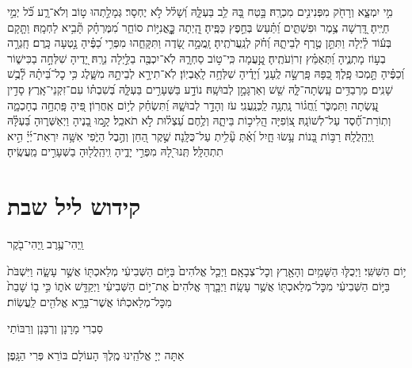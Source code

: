 \documentclass[twoside, openany, parskip=half, 11pt]{book}
\begin{document}
מִ֣י יִמְצָ֑א וְרָחֹ֖ק מִפְּנִינִ֣ים מִכְרָֽהּ׃ \hfill \break
בָּ֣טַח בָּ֭הּ לֵ֥ב בַּעְלָּ֑הּ וְ֝שָׁל֗ל לֹ֣א יֶחְסָר׃ \hfill \break
גְּמָלַ֣תְהוּ ט֣וֹב וְלֹא־רָ֑ע כֹּ֝֗ל יְמֵ֣י חַיֶּֽיהָ׃ \hfill \break
דָּֽ֭רְשָׁה צֶ֥מֶר וּפִשְׁתִּ֑ים וַ֝תַּ֗עַשׂ בְּחֵ֣פֶץ כַּפֶּֽיהָ׃ \hfill \break
הָֽ֭יְתָה כׇׇׇׇׇׇׇׇּֽאֳנִיּ֣וֹת סוֹחֵ֑ר מִ֝מֶּרְחָ֗ק תָּ֘בִ֥יא לַחְמָֽהּ׃ \hfill \break
וַתָּ֤קָם בְּע֬וֹד לַ֗יְלָה וַתִּתֵּ֣ן טֶ֣רֶף לְבֵיתָ֑הּ וְ֝חֹ֗ק לְנַֽעֲרֹתֶֽיהָ׃ \hfill \break
זָֽמֲמָ֣ה שָׂ֭דֶה וַתִּקָּחֵ֑הוּ מִפְּרִ֥י כַ֝פֶּ֗יהָ נָ֣טְעָה כָּֽרֶם׃ \hfill \break
חָֽגְרָ֣ה בְע֣וֹז מָתְנֶ֑יהָ וַ֝תְּאַמֵּ֗ץ זְרוֹֽעֹתֶֽיהָ׃ \hfill \break
טָֽ֣֭עֲמָה כִּֽי־ט֣וֹב סַחְרָ֑הּ לֹֽא־יִכְבֶּ֖ה בַלַּ֣יְלָה נֵרָֽהּ׃ \hfill \break
יָ֭דֶיהָ שִׁלְּחָ֣ה בַכִּישׁ֑וֹר וְ֝כַפֶּ֗יהָ תָּ֣מְכוּ פָֽלֶךְ׃ \hfill \break
כַּ֭פָּהּ פָּֽרְשָׂ֣ה לֶֽעָנִ֑י וְ֝יָדֶ֗יהָ שִׁלְּחָ֥ה לָֽאֶבְיֽוֹן׃ \hfill \break
לֹֽא־תִירָ֣א לְבֵיתָ֣הּ מִשָּׁ֑לֶג כִּ֥י כׇל־בֵּ֝יתָ֗הּ לָ֘בֻ֥שׁ שָׁנִֽים׃ \hfill \break
מַרְבַדִּ֥ים עָֽשְׂתָה־לָּ֑הּ שֵׁ֖שׁ וְאַרְגָּמָ֣ן לְבוּשָֽׁהּ׃ \hfill \break
נוֹדָ֣ע בַּשְּׁעָרִ֣ים בַּעְלָּ֑הּ בְּ֝שִׁבְתּ֗וֹ עִם־זִקְנֵי־אָֽרֶץ׃ \hfill \break
סָדִ֣ין עָֽ֭שְׂתָה וַתִּמְכֹּ֑ר וַֽ֝חֲג֗וֹר נָֽתְנָ֥ה לַֽכְּנַֽעֲנִֽי׃ \hfill \break
עֹז וְהָדָ֣ר לְבוּשָׁ֑הּ וַ֝תִּשְׂחַ֗ק לְי֣וֹם אַֽחֲרֽוֹן׃ \hfill \break
פִּ֭יהָ פָּֽתְחָ֣ה בְחָכְמָ֑ה וְתֽוֹרַת־חֶ֝֗סֶד עַל־לְשׁוֹנָֽהּ׃ \hfill \break
צ֭וֹֽפִיָּה הֲֽלִיכ֣וֹת בֵּיתָ֑הּ וְלֶ֥חֶם עַ֝צְל֗וּת לֹ֣א תֹאכֵֽל׃ \hfill \break
קָ֣מוּ בָ֭נֶיהָ וַיְאַשְּׁר֑וּהָ בַּ֝עְלָּ֗הּ וַֽיְהַֽלֲלָֽהּ׃ \hfill \break
רַבּ֣וֹת בָּ֭נוֹת עָ֥שׂוּ חָ֑יִל וְ֝אַ֗תְּ עָ֘לִ֥יתְ עַל־כֻּלָּֽנָה׃ \hfill \break
שֶׁ֣קֶר הַ֭חֵן וְהֶ֣בֶל הַיֹּ֑פִי אִשָּׁ֥ה יִרְאַת־יְ֜יָ֗ הִ֣יא תִתְהַלָּֽל׃\hfill \break
תְּֽנוּ־לָ֭הּ מִפְּרִ֣י יָדֶ֑יהָ וִֽיהַֽלֲל֖וּהָ בַשְּׁעָרִ֣ים מַֽעֲשֶֽׂיהָ׃\hfill \break


\section*{ קידוש ליל שבת }

\begin{small}וַֽיְהִי־עֶ֥רֶב וַֽיְהִי־בֹ֖קֶר\end{small}
י֥וֹם הַשִּׁשִּֽׁי׃ וַיְכֻלּ֛וּ הַשָּׁמַ֥יִם וְהָאָ֖רֶץ וְכׇל־צְבָאָֽם׃ וַיְכַ֤ל אֱלֹהִים֙ בַּיּ֣וֹם הַשְּׁבִיעִ֔י מְלַאכְתּ֖וֹ אֲשֶׁ֣ר עָשָׂ֑ה וַיִּשְׁבֹּת֙ בַּיּ֣וֹם הַשְּׁבִיעִ֔י מִכׇּל־מְלַאכְתּ֖וֹ אֲשֶׁ֥ר עָשָֽׂה׃ וַיְבָ֤רֶךְ אֱלֹהִים֙ אֶת־י֣וֹם הַשְּׁבִיעִ֔י וַיְקַדֵּ֖שׁ אֹת֑וֹ כִּ֣י ב֤וֹ שָׁבַת֙ מִכׇּל־מְלַאכְתּ֔וֹ אֲשֶׁר־בָּרָ֥א אֱלֹהִ֖ים לַֽעֲשֽׂוֹת׃

\begin{footnotesize}
סַבְרִי מָרָנָן וְרְבָּנָן וְרַבּוֹתַי\\
\end{footnotesize}
אַתָּה יְיָ אֱלֹהֵֽינוּ מֶֽלֶךְ הָעוֹלָם בּוֹרֵא פְּרִי הַגָּֽפֶן׃
\end{document}

